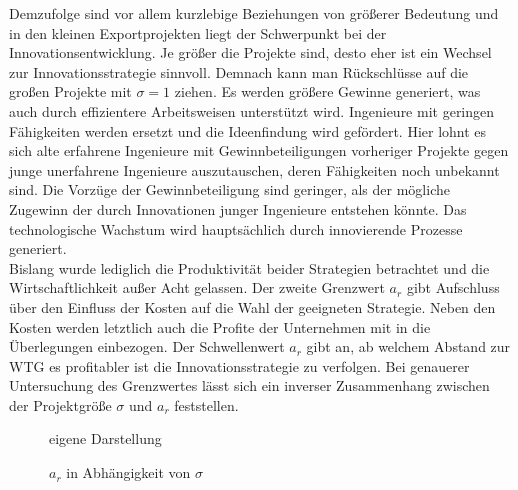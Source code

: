 Demzufolge sind vor allem kurzlebige Beziehungen von größerer Bedeutung und in den kleinen Exportprojekten liegt der Schwerpunkt bei der Innovationsentwicklung. Je größer die Projekte sind, desto eher ist ein Wechsel zur Innovationsstrategie sinnvoll. Demnach kann man Rückschlüsse auf die großen Projekte mit $\sigma=1$ ziehen. Es werden größere Gewinne generiert, was auch durch effizientere Arbeitsweisen unterstützt wird. Ingenieure mit geringen Fähigkeiten werden ersetzt und die Ideenfindung wird gefördert.
Hier lohnt es sich alte erfahrene Ingenieure mit Gewinnbeteiligungen vorheriger Projekte gegen junge unerfahrene Ingenieure auszutauschen, deren Fähigkeiten noch unbekannt sind. Die Vorzüge der Gewinnbeteiligung sind geringer, als der mögliche Zugewinn der durch Innovationen junger Ingenieure entstehen könnte. Das technologische Wachstum wird hauptsächlich durch innovierende Prozesse generiert.\\ 


Bislang wurde lediglich die Produktivität beider Strategien betrachtet und die Wirtschaftlichkeit außer Acht gelassen. Der zweite Grenzwert $a_r$ gibt Aufschluss über den Einfluss der Kosten auf die Wahl der geeigneten Strategie. Neben den Kosten werden letztlich auch die Profite der Unternehmen mit in die Überlegungen einbezogen. Der Schwellenwert $a_r$ gibt an, ab welchem Abstand zur WTG es profitabler ist die Innovationsstrategie zu verfolgen. Bei genauerer Untersuchung des Grenzwertes lässt sich ein inverser Zusammenhang zwischen der Projektgröße $\sigma$ und $a_r$ feststellen.\\

		\begin{figure*}[h]
			\hfill{}  eigene Darstellung
			\caption{$a_r$ in Abhängigkeit von $\sigma$ }
			\label{fig:VerhaltenVonAR}
		\end{figure*}


